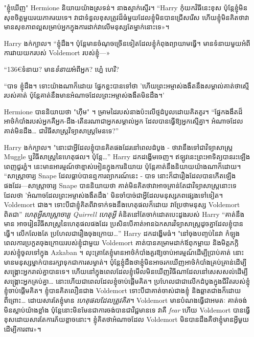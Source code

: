 {{{{"ខ្ញុំឃើញ" Hermione និយាយយ៉ាងស្រទន់។ នាងស្ទាក់ស្ទើរ។ “Harry កុំយកវិធីនេះខុស ប៉ុន្តែខ្ញុំមិនសុខចិត្តមួយរយភាគរយទេ។ វា​ជា​ទំនួល​ខុស​ត្រូវ​ដ៏​ធំ​មួយ​ដែល​ខ្ញុំ​មិន​បាន​ជ្រើសរើស ហើយ​ខ្ញុំ​មិន​គិត​ថា​វា​មាន​សុខភាព​ល្អ​សម្រាប់​អ្នក​ក្នុង​ការ​ដាក់​វា​លើ​មនុស្ស​តែ​ម្នាក់​នោះ​ទេ»។

Harry ងក់ក្បាល។ “ខ្ញុំដឹង។ ប៉ុន្តែ​មាន​ចំណុច​ច្រើន​ទៀត​ដែល​ខ្ញុំ​កំពុង​ព្យាយាម​ធ្វើ។ មាន​ទំនាយ​មួយ​អំពី​ការ​វាយ​យក​របស់ Voldemort របស់​ខ្ញុំ—»

“136€{ទំនាយ}? មាន\emph{ទំនាយ}អំពីអ្នក? ហ្អេ៎ ហេរី?

“បាទ ខ្ញុំដឹង។ ទោះយ៉ាងណាក៏ដោយ ផ្នែកខ្លះបានទៅថា 'ហើយព្រះអម្ចាស់ងងឹតនឹងសម្គាល់គាត់ថាស្មើរបស់គាត់ ប៉ុន្តែគាត់នឹងមានអំណាចដែលព្រះអម្ចាស់ងងឹតមិនដឹង។'

Hermione បាននិយាយថា "ហ៊ឺម" ។ ម្រាមដៃរបស់នាងប៉ះលើថ្មដំបូលដោយគិតគូរ។ “ផ្នែកងងឹតដ៏អាថ៌កំបាំងរបស់អ្នកគឺអ្នក-ដឹង-តើនរណាជាអ្នកសម្គាល់អ្នក ដែលបានធ្វើឱ្យអ្នកស្មើគ្នា។ អំណាច​ដែល​គាត់​មិន​ដឹង… ជា​វិធីសាស្ត្រ​វិទ្យាសាស្ត្រ​មែនទេ?”

Harry ងក់ក្បាល។ "នោះជាអ្វីដែលខ្ញុំបានគិតផងដែរនៅពេលដំបូង - ថាវានឹងទៅជាវិទ្យាសាស្ត្រ Muggle ឬវិធីសាស្រ្តនៃហេតុផល។ ប៉ុន្តែ…” Harry ដកដង្ហើមចេញ។ ឥឡូវនេះព្រះអាទិត្យបានរះឡើងពេញជួរភ្នំ។ នេះមានអារម្មណ៍ថាខ្មាស់អៀនក្នុងការនិយាយ ប៉ុន្តែគាត់នឹងនិយាយយ៉ាងណាក៏ដោយ។ “សាស្រ្តាចារ្យ Snape ដែលធ្លាប់បានឮការព្យាករណ៍នេះ - បាទ នោះក៏ជារឿងដែលបានកើតឡើងផងដែរ—សាស្រ្តាចារ្យ Snape បាននិយាយថា គាត់មិនគិតថាវាអាចគ្រាន់តែជាវិទ្យាសាស្ត្រនោះទេ ដែលថា 'អំណាចដែលព្រះអម្ចាស់ងងឹតដឹង' មិនចាំបាច់ជាអ្វីដែលមនុស្សភពផ្សេងទៅទៀត។ Voldemort ជាង។ ទោះបីជាខ្ញុំគិតពីវាទាក់ទងនឹងហេតុផលក៏ដោយ វាប្រែថាមនុស្ស Voldemort ពិតជា” \emph{ហេតុអ្វីសាស្រ្តាចារ្យ Quirrell ហេតុអ្វី} គំនិតនៅតែចាក់ដោតបេះដូងរបស់ Harry “គាត់នឹងមាន អាចរៀនវិធីសាស្រ្តនៃហេតុផលផងដែរ ប្រសិនបើគាត់អានឯកសារវិទ្យាសាស្ត្រដូចគ្នាដែលខ្ញុំបានធ្វើ។ លើកលែងតែ ប្រហែលជារឿងចុងក្រោយ…” Harry ដកដង្ហើមធំ។ "នៅចុងបញ្ចប់នៃវា កំឡុងពេលការប្រកួតចុងក្រោយរបស់ខ្ញុំជាមួយ Voldemort គាត់បានគម្រាមដាក់ឪពុកម្តាយ និងមិត្តភក្តិរបស់ខ្ញុំចូលទៅក្នុង Azkaban ។ លុះត្រាតែ​ខ្ញុំ​មាន​អាថ៌កំបាំង​គួរ​ឱ្យ​ចាប់​អារម្មណ៍​ដើម្បី​ប្រាប់​គាត់ នោះ​មាន​មនុស្ស​ម្នាក់​បាន​រក្សា​ទុក​ជា​ការ​សម្ងាត់។ ប៉ុន្តែ​ខ្ញុំ​ដឹង​ថា​ខ្ញុំ​មិន​អាច​រក​ឃើញ​អាថ៌កំបាំង​គ្រប់គ្រាន់​ដើម្បី​សង្គ្រោះ​អ្នក​រាល់​គ្នា​បាន​ទេ។ ហើយនៅក្នុងពេលដែលខ្ញុំមើលមិនឃើញវិធីណាដែលនៅសេសសល់ដើម្បីសង្គ្រោះអ្នកគ្រប់គ្នា… នោះហើយជាពេលដែលខ្ញុំចាប់ផ្តើមគិត។ ប្រហែលជាជាលើកដំបូងក្នុងជីវិតរបស់ខ្ញុំ ខ្ញុំចាប់ផ្តើមគិត។ ខ្ញុំបានគិតលឿនជាង Voldemort ទោះបីជាគាត់ចាស់ជាងខ្ញុំ និងឆ្លាតជាងក៏ដោយ ពីព្រោះ… ដោយសារតែខ្ញុំមាន \emph{ហេតុផលដែលត្រូវគិត}។ Voldemort មាន​បំណង​ធ្វើ​ជា​អមតៈ គាត់​ចង់​មិន​ស្លាប់​យ៉ាង​ខ្លាំង ប៉ុន្តែ​នោះ​មិន​មែន​ជា​ការ​ចង់​បាន​ជា​វិជ្ជមាន​ទេ វា​គឺ \emph{fear} ហើយ Voldemort បាន​ធ្វើ​ខុស​ដោយ​សារ​តែ​ការ​ភ័យ​ខ្លាច​នោះ។ ខ្ញុំ​គិត​ថា​អំណាច​ដែល Voldemort មិន​បាន​ដឹង​គឺ​ថា​ខ្ញុំ​មាន​អ្វី​មួយ​ដើម្បី​ការពារ»។

}}}}
